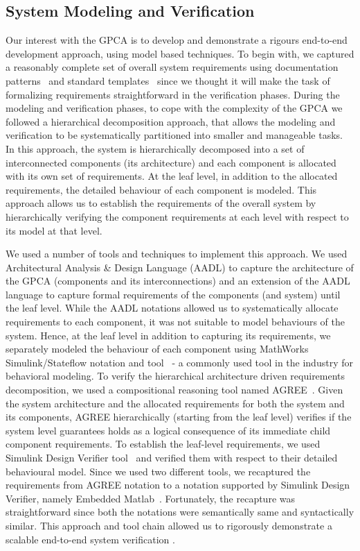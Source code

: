 \subsection {System Modeling and Verification}
\vspace{-0.07in}
Our interest with the GPCA is to develop and demonstrate a rigours end-to-end development approach, using model based techniques. To begin with, we captured a reasonably complete set of overall system requirements using documentation patterns~\cite{mavin2009easy} and standard templates~\cite{IEEEFormats} since we thought it will make the task of formalizing requirements straightforward in the verification phases. During the modeling and verification phases, to cope with the complexity of the GPCA we followed a hierarchical decomposition approach, that allows the modeling and verification to be systematically partitioned into smaller and manageable tasks. In this approach, the system is hierarchically decomposed into a set of interconnected components (its architecture) and each component is allocated with its own set of requirements. At the leaf level, in addition to the allocated requirements, the detailed behaviour of each component is modeled. This approach allows us to establish the requirements of the overall system by hierarchically verifying the component requirements at each level with respect to its model at that level.

We used a number of tools and techniques to implement this approach. We used Architectural Analysis \& Design Language (AADL) to capture the architecture of the GPCA (components and its interconnections) and an extension of the AADL language to capture formal requirements of the components (and system) until the leaf level. While the AADL notations allowed us to systematically allocate requirements to each component, it was not suitable to model behaviours of the system. Hence, at the leaf level in addition to capturing its requirements, we separately modeled the behaviour of each component using MathWorks Simulink/Stateflow notation and tool~\cite{MathWorks} - a commonly used tool in the industry for behavioral modeling. To verify the hierarchical architecture driven requirements decomposition, we used a compositional reasoning tool named AGREE~\cite{NFM2012:CoGaMiWhLaLu}. Given the system architecture and the allocated requirements for both the system and its components, AGREE hierarchically (starting from the leaf level) verifies if the system level guarantees holds as a logical consequence of its immediate child component requirements. To establish the leaf-level requirements, we used Simulink Design Verifier tool~\cite{MathWorks} and verified them with respect to their detailed behavioural model. Since we used two different tools, we recaptured the requirements from AGREE notation to a notation supported by Simulink Design Verifier, namely Embedded Matlab~\cite{MathWorks}. Fortunately, the recapture was straightforward since both the notations were semantically same and syntactically similar. This approach and tool chain allowed us to rigorously demonstrate a scalable end-to-end system verification   .

